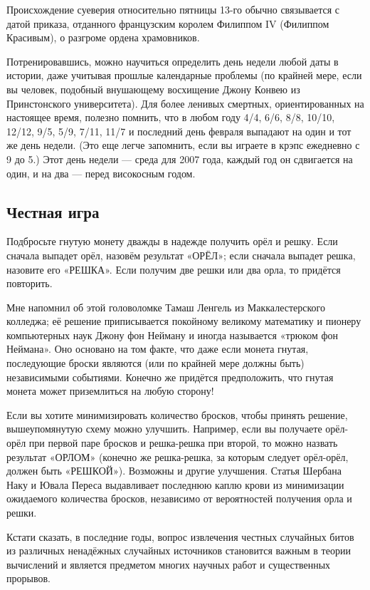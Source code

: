 Происхождение суеверия относительно пятницы 13-го обычно связывается с датой приказа, отданного французским королем Филиппом IV (Филиппом Красивым), о разгроме ордена храмовников.

Потренировавшись, можно научиться определить день недели любой даты в истории, даже учитывая прошлые календарные проблемы
(по крайней мере, если вы человек, подобный внушающему восхищение Джону Конвею из Принстонского университета).
Для более ленивых смертных, ориентированных на настоящее время, полезно помнить, что в любом году
4/4, 6/6, 8/8, 10/10, 12/12, 9/5, 5/9, 7/11, 11/7 и последний день февраля выпадают на один и тот же день недели.
(Это еще легче запомнить, если вы играете в крэпс ежедневно с 9 до 5.)
Этот день недели --- среда для 2007 года, каждый год он сдвигается на один, и на два --- перед високосным годом.

\subsection*{Честная игра}

Подбросьте гнутую монету дважды в надежде получить орёл и решку.
Если сначала выпадет орёл, назовём результат «ОРЁЛ»;
если сначала выпадет решка, назовите его «РЕШКА».
Если получим две решки или два орла, то придётся повторить.

Мне напомнил об этой головоломке Тамаш Ленгель из Маккалестерского колледжа;
её решение приписывается покойному великому математику и пионеру компьютерных наук Джону фон Нейману и иногда называется «трюком фон Неймана».
Оно основано на том факте, что даже если монета гнутая, последующие броски являются (или по крайней мере должны быть) независимыми событиями.
Конечно же придётся предположить, что гнутая монета может приземлиться на любую сторону!

Если вы хотите минимизировать количество бросков, чтобы принять решение, вышеупомянутую схему можно улучшить. Например, если вы получаете орёл-орёл при первой паре бросков и решка-решка при второй, то можно назвать результат «ОРЛОМ» (конечно же решка-решка, за которым следует орёл-орёл, должен быть «РЕШКОЙ»).
Возможны и другие улучшения.
Статья Шербана Наку и Ювала Переса \cite{nacu-peres} выдавливает последнюю каплю крови из минимизации ожидаемого количества бросков, независимо от вероятностей получения орла и решки.

Кстати сказать, в последние годы, вопрос извлечения честных случайных битов из различных ненадёжных случайных источников становится важным в теории вычислений и является предметом многих научных работ и существенных прорывов.

